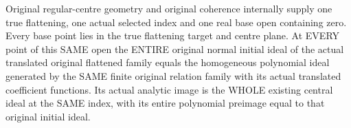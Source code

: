 \begin{theorem}
\label{hir:real-domain-original-all-nearby-initial-polynomial-kernels}
\leanok
Original regular-centre geometry and original coherence internally supply
one true flattening, one actual selected index and one real base open
containing zero. Every base point lies in the true flattening target and
centre plane. At EVERY point of this SAME open the ENTIRE original normal
initial ideal of the actual translated original flattened family equals
the homogeneous polynomial ideal generated by the SAME finite original
relation family with its actual translated coefficient functions. Its actual
analytic image is the WHOLE existing central ideal at the SAME index, with
its entire polynomial preimage equal to that original initial ideal.
\end{theorem}
